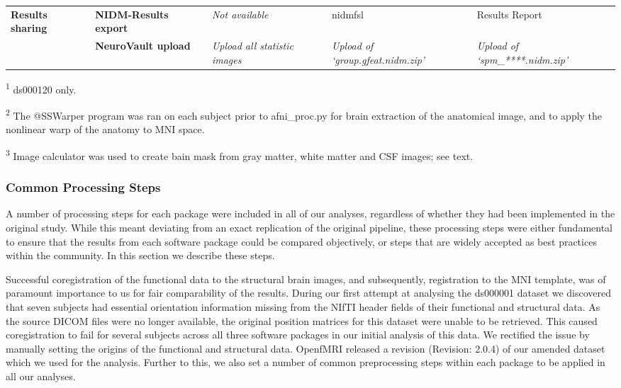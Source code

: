 \begin{table}[htbp]
\begin{threeparttable}
\begin{tabular}{@{}p{}*{4}{L{\tabcolsep\relax}}@{}}
\midrule
\textbf{Results \linebreak sharing} & \textbf{NIDM-Results export} & \textit{Not available} & nidmfsl & Results Report \\
\cmidrule(lr){2-5}
& \textbf{NeuroVault upload} & \textit{Upload all statistic images} & \textit{Upload of `group.gfeat.nidm.zip'} & \textit{Upload of `spm\_****.nidm.zip'}\\
\bottomrule
\end{tabular}
    \begin{tablenotes}
      \small
      \item \textsuperscript{1} ds000120 only.
      \item \textsuperscript{2} The @SSWarper program was ran on each subject prior to afni\_proc.py for brain extraction of the anatomical image, and to apply the nonlinear warp of the anatomy to MNI space.
      \item \textsuperscript{3} Image calculator was used to create bain mask from gray matter, white matter and CSF images; see text. 
    \end{tablenotes}
    \end{threeparttable}
\end{table}

\subsubsection{Common Processing Steps}
A number of processing steps for each package were included in all of our analyses, regardless of whether they had been implemented in the original study. While this meant deviating from an exact replication of the original pipeline, these processing steps were either fundamental to ensure that the results from each software package could be compared objectively, or steps that are widely accepted as best practices within the community. In this section we describe these steps.

Successful coregistration of the functional data to the structural brain images, and subsequently, registration to the MNI template, was of paramount importance to us for fair comparability of the results. During our first attempt at analysing the ds000001 dataset we discovered that seven subjects had essential orientation information missing from the NIfTI header fields of their functional and structural data. As the source DICOM files were no longer available, the original position matrices for this dataset were unable to be retrieved. This caused coregistration to fail for several subjects across all three software packages in our initial analysis of this data. We rectified the issue by manually setting the origins of the functional and structural data. OpenfMRI released a revision (Revision: 2.0.4) of our amended dataset which we used for the analysis. Further to this, we also set a number of common preprocessing steps within each package to be applied in all our analyses.   

